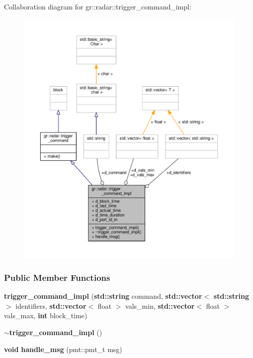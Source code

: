 Collaboration diagram for gr\+:\+:radar\+:\+:trigger\+\_\+command\+\_\+impl\+:
\nopagebreak
\begin{figure}[H]
\begin{center}
\leavevmode
\includegraphics[width=350pt]{d4/d8a/classgr_1_1radar_1_1trigger__command__impl__coll__graph}
\end{center}
\end{figure}
\subsubsection*{Public Member Functions}
\begin{DoxyCompactItemize}
\item 
{\bf trigger\+\_\+command\+\_\+impl} ({\bf std\+::string} command, {\bf std\+::vector}$<$ {\bf std\+::string} $>$ identifiers, {\bf std\+::vector}$<$ float $>$ vals\+\_\+min, {\bf std\+::vector}$<$ float $>$ vals\+\_\+max, {\bf int} block\+\_\+time)
\item 
{\bf $\sim$trigger\+\_\+command\+\_\+impl} ()
\item 
{\bf void} {\bf handle\+\_\+msg} (pmt\+::pmt\+\_\+t msg)
\end{DoxyCompactItemize}
